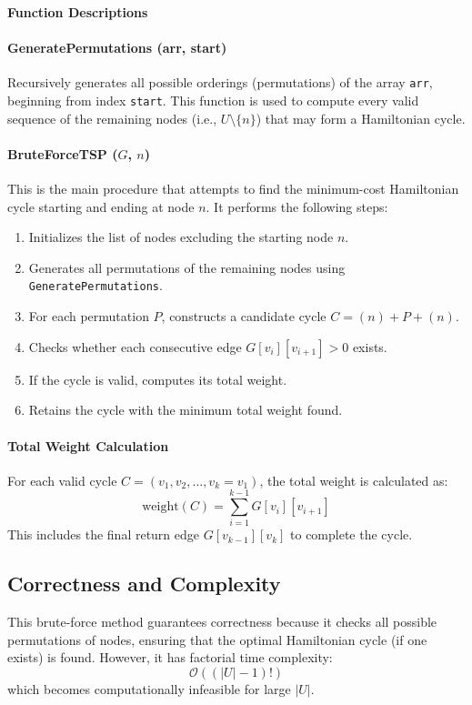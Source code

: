 \pagebreak
\textbf{Function Descriptions}

\paragraph{GeneratePermutations (arr, start)} 
Recursively generates all possible orderings (permutations) of the array \texttt{arr}, beginning from index \texttt{start}. This function is used to compute every valid sequence of the remaining nodes (i.e., $U \setminus \{n\}$) that may form a Hamiltonian cycle.

\paragraph{BruteForceTSP ($G$, $n$)} 
This is the main procedure that attempts to find the minimum-cost Hamiltonian cycle starting and ending at node $n$. It performs the following steps:

\begin{enumerate}
    \item Initializes the list of nodes excluding the starting node $n$.
    \item Generates all permutations of the remaining nodes using \texttt{GeneratePermutations}.
    \item For each permutation $P$, constructs a candidate cycle $C = (n) + P + (n)$.
    \item Checks whether each consecutive edge $G[v_i][v_{i+1}] > 0$ exists.
    \item If the cycle is valid, computes its total weight.
    \item Retains the cycle with the minimum total weight found.
\end{enumerate}

\paragraph{Total Weight Calculation}
For each valid cycle $C = (v_1, v_2, \ldots, v_k = v_1)$, the total weight is calculated as:
\[
\text{weight}(C) = \sum_{i=1}^{k-1} G[v_i][v_{i+1}]
\]
This includes the final return edge $G[v_{k-1}][v_k]$ to complete the cycle.

\subsection*{Correctness and Complexity}

This brute-force method guarantees correctness because it checks all possible permutations of nodes, ensuring that the optimal Hamiltonian cycle (if one exists) is found. However, it has factorial time complexity:
\[
\mathcal{O}((|U| - 1)!)
\]
which becomes computationally infeasible for large $|U|$.